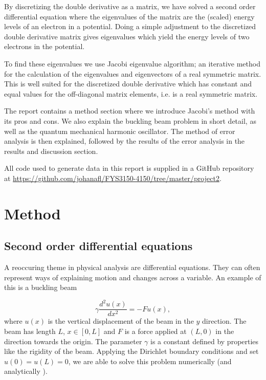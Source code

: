 \documentclass{emulateapj}
\begin{document}
    By discretizing the double derivative as a matrix, we have solved a second order differential equation where the eigenvalues of the matrix are the (scaled) energy levels of an electron in a potential. Doing a simple adjustment to the discretized double derivative matrix gives eigenvalues which yield the energy levels of two electrons in the potential.
    
    To find these eigenvalues we use Jacobi eigenvalue algorithm; an iterative method for the calculation of the eigenvalues and eigenvectors of a real symmetric matrix. This is well suited for the discretized double derivative which has constant and equal values for the off-diagonal matrix elements, i.e. is a real symmetric matrix.
    
    The report contains a method section where we introduce Jacobi's method with its pros and cons. We also explain the buckling beam problem in short detail, as well as the quantum mechanical harmonic oscillator. The method of error analysis is then explained, followed by the results of the error analysis in the results and discussion section.
    
    All code used to generate data in this report is supplied in a GitHub repository at \url{https://github.com/johanafl/FYS3150-4150/tree/master/project2}.
\section{\textbf{Method}}

    \subsection{\textbf{Second order differential equations}}
    
        A reoccuring theme in physical analysis are differential equations. They can often represent ways of explaining motion and changes across a variable. An example of this is a buckling beam \cite{beam_diff, compfys}

        \begin{equation}\label{eq:beam}
            \gamma \frac{d^2 u(x)}{dx^2} = -F u(x),
        \end{equation}
        where \(u(x)\) is the vertical displacement of the beam in the \(y\) direction. 
        The beam has length \(L\), \(x\in [0,L]\) and \(F\) is a force applied at \((L,0)\) in the direction towards the origin. The parameter \(\gamma\) is a constant defined by properties like the rigidity of the beam. 
        Applying the Dirichlet boundary conditions \cite[Chapter 13]{matmet} and set \(u(0)=u(L)=0\), we are able to solve this problem numerically (and analytically \cite[chapter 10]{kalkulus}).
        
\end{document}
